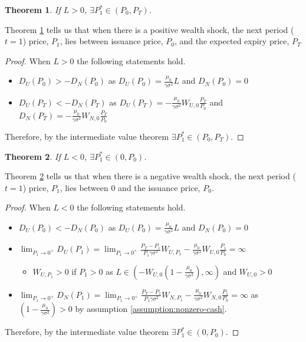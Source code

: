 \documentclass[12pt]{article}
\newtheorem{theorem}{Theorem}
\begin{document}
\begin{theorem}
If $L>0$, $\exists P_1^* \in (P_0, P_T)$.
\label{thm:pos_wealth_shock}
\end{theorem}
\noindent Theorem \ref{thm:pos_wealth_shock} tells us that when there is a positive wealth shock, the next period ($t=1$) price, $P_1$, lies between issuance price, $P_0$, and the expected expiry price, $P_T$
\begin{proof}
    When $L>0$ the following statements hold.
    \begin{itemize}
        \item $D_U(P_0) > - D_N(P_0)$ as $D_U(P_0) = \frac{\mu_0}{\gamma\sigma^2}L$ and $D_N(P_0) = 0$
        \item $D_U(P_T) < -D_N(P_T)$ as $D_U(P_T) = -\frac{\mu_0}{\gamma\sigma^2}W_{U,0}\frac{P_T}{P_0}$ and $D_N(P_T) = -\frac{\mu_0}{\gamma\sigma^2}W_{N,0}\frac{P_T}{P_0}$
    \end{itemize}
    Therefore, by the intermediate value theorem $\exists P_1^* \in (P_0, P_T)$. 
\end{proof}
\begin{theorem}
If $L<0$, $\exists P_1^* \in (0, P_0)$.
\label{thm:neg_wealth_shock}
\end{theorem}
\noindent Theorem \ref{thm:neg_wealth_shock} tells us that when there is a negative wealth shock, the next period ($t=1$) price, $P_1$, lies between 0 and the issuance price, $P_0$.
\begin{proof}
    When $L<0$ the following statements hold.
    \begin{itemize}
        \item $D_U(P_0) < - D_N(P_0)$ as $D_U(P_0) = \frac{\mu_0}{\gamma\sigma^2}L$ and $D_N(P_0) = 0$
        \item $\lim_{P_1 \to 0^+} D_U(P_1) = \lim_{P_1 \to 0^+} \frac{P_T-P_1}{P_1\gamma\sigma^2}W_{U,P_1} - \frac{\mu_0}{\gamma\sigma^2}W_{U,0}\frac{P_1}{P_0} = \infty$
        \begin{itemize}
            \item $W_{U,P_1} > 0$ if $P_1 >0$ as $L \in \left(-W_{U,0}\left(1-\frac{\mu_0}{\gamma\sigma^2}\right), \infty\right)$ and $W_{U,0} > 0$
        \end{itemize}
        \item $\lim_{P_1 \to 0^+} D_N(P_1) = \lim_{P_1 \to 0^+} \frac{P_T-P_1}{P_1\gamma\sigma^2}W_{N,P_1} - \frac{\mu_0}{\gamma\sigma^2}W_{N,0}\frac{P_1}{P_0} = \infty$ as $(1-\frac{\mu_0}{\gamma\sigma^2}) > 0$ by assumption \ref{assumption:nonzero-cash}.
    \end{itemize}
    Therefore, by the intermediate value theorem $\exists P_1^* \in (0, P_0)$. 
\end{proof}
\end{document}
